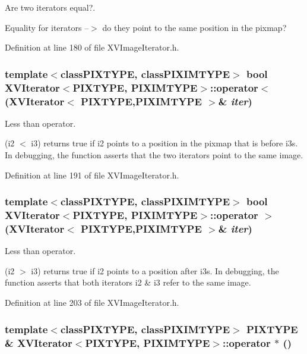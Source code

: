 Are two iterators equal?.

Equality for iterators --$>$ do they point to the same position in the pixmap? 

Definition at line 180 of file XVImage\-Iterator.h.\label{XVIterator_a12}
\hypertarget{class_XVIterator_a12}{
\subsubsection[operator<]{\setlength{\rightskip}{0pt plus 5cm}template$<$classPIXTYPE, classPIXIMTYPE$>$ bool XVIterator$<$PIXTYPE, PIXIMTYPE$>$::operator$<$ (XVIterator$<$ PIXTYPE,PIXIMTYPE $>$\& {\em iter})}}


Less than operator.

(i2 $<$ i3) returns true if i2 points to a position in the pixmap that is before i3s. In debugging, the function asserts that the  two iterators point to the same image. 

Definition at line 191 of file XVImage\-Iterator.h.\label{XVIterator_a13}
\hypertarget{class_XVIterator_a13}{
\subsubsection[operator >]{\setlength{\rightskip}{0pt plus 5cm}template$<$classPIXTYPE, classPIXIMTYPE$>$ bool XVIterator$<$PIXTYPE, PIXIMTYPE$>$::operator $>$ (XVIterator$<$ PIXTYPE,PIXIMTYPE $>$\& {\em iter})}}


Less than operator.

(i2 $>$ i3) returns true if i2 points to a position after i3s. In debugging, the function asserts that both iterators i2 \&  i3 refer to the same image. 

Definition at line 203 of file XVImage\-Iterator.h.\label{XVIterator_a14}
\hypertarget{class_XVIterator_a14}{
\subsubsection[operator *]{\setlength{\rightskip}{0pt plus 5cm}template$<$classPIXTYPE, classPIXIMTYPE$>$ PIXTYPE \& XVIterator$<$PIXTYPE, PIXIMTYPE$>$::operator $\ast$ ()}}


